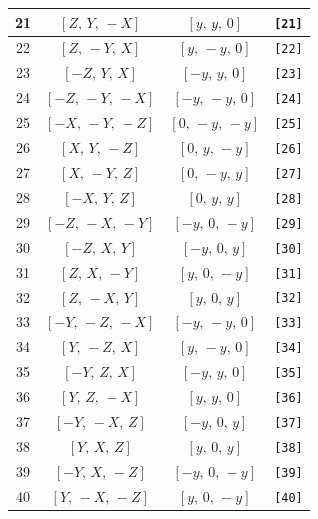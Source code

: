 \documentclass[fleqn,8pt]{jsarticle}
\begin{document}
\begin{longtable}{cccc}
21 & $\left[ Z,\, Y,\, - X \right]$ & $\left[ y,\, y,\, 0 \right]$ & {\tt [21]} \\ \hline
22 & $\left[ Z,\, - Y,\, X \right]$ & $\left[ y,\, - y,\, 0 \right]$ & {\tt [22]} \\ \hline
23 & $\left[ - Z,\, Y,\, X \right]$ & $\left[ - y,\, y,\, 0 \right]$ & {\tt [23]} \\ \hline
24 & $\left[ - Z,\, - Y,\, - X \right]$ & $\left[ - y,\, - y,\, 0 \right]$ & {\tt [24]} \\ \hline
25 & $\left[ - X,\, - Y,\, - Z \right]$ & $\left[ 0,\, - y,\, - y \right]$ & {\tt [25]} \\ \hline
26 & $\left[ X,\, Y,\, - Z \right]$ & $\left[ 0,\, y,\, - y \right]$ & {\tt [26]} \\ \hline
27 & $\left[ X,\, - Y,\, Z \right]$ & $\left[ 0,\, - y,\, y \right]$ & {\tt [27]} \\ \hline
28 & $\left[ - X,\, Y,\, Z \right]$ & $\left[ 0,\, y,\, y \right]$ & {\tt [28]} \\ \hline
29 & $\left[ - Z,\, - X,\, - Y \right]$ & $\left[ - y,\, 0,\, - y \right]$ & {\tt [29]} \\ \hline
30 & $\left[ - Z,\, X,\, Y \right]$ & $\left[ - y,\, 0,\, y \right]$ & {\tt [30]} \\ \hline
31 & $\left[ Z,\, X,\, - Y \right]$ & $\left[ y,\, 0,\, - y \right]$ & {\tt [31]} \\ \hline
32 & $\left[ Z,\, - X,\, Y \right]$ & $\left[ y,\, 0,\, y \right]$ & {\tt [32]} \\ \hline
33 & $\left[ - Y,\, - Z,\, - X \right]$ & $\left[ - y,\, - y,\, 0 \right]$ & {\tt [33]} \\ \hline
34 & $\left[ Y,\, - Z,\, X \right]$ & $\left[ y,\, - y,\, 0 \right]$ & {\tt [34]} \\ \hline
35 & $\left[ - Y,\, Z,\, X \right]$ & $\left[ - y,\, y,\, 0 \right]$ & {\tt [35]} \\ \hline
36 & $\left[ Y,\, Z,\, - X \right]$ & $\left[ y,\, y,\, 0 \right]$ & {\tt [36]} \\ \hline
37 & $\left[ - Y,\, - X,\, Z \right]$ & $\left[ - y,\, 0,\, y \right]$ & {\tt [37]} \\ \hline
38 & $\left[ Y,\, X,\, Z \right]$ & $\left[ y,\, 0,\, y \right]$ & {\tt [38]} \\ \hline
39 & $\left[ - Y,\, X,\, - Z \right]$ & $\left[ - y,\, 0,\, - y \right]$ & {\tt [39]} \\ \hline
40 & $\left[ Y,\, - X,\, - Z \right]$ & $\left[ y,\, 0,\, - y \right]$ & {\tt [40]} \\ \hline

\end{longtable}
\end{document}
